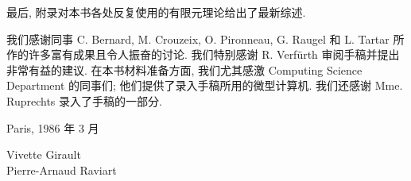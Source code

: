 最后, 附录对本书各处反复使用的有限元理论给出了最新综述.

我们感谢同事 C. Bernard, M. Crouzeix, O. Pironneau, G. Raugel 和 L. Tartar 所作的许多富有成果且令人振奋的讨论. 我们特别感谢 R. Verfürth 审阅手稿并提出非常有益的建议. 在本书材料准备方面, 我们尤其感激 Computing Science Department 的同事们; 他们提供了录入手稿所用的微型计算机. 我们还感谢 Mme. Ruprechts 录入了手稿的一部分.

\begin{flushleft}
Paris, 1986 年 3 月
\end{flushleft}
\begin{flushright}
Vivette Girault\\
Pierre-Arnaud Raviart
\end{flushright}
